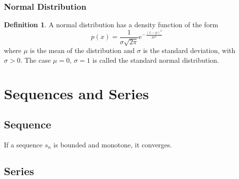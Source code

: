 \documentclass[12pt]{article}
\theoremstyle{definition}
\theoremstyle{definition}
\newtheorem{definition}{Definition}[section]
\theoremstyle{remark}
\theoremstyle{definition}
\theoremstyle{definition}
\theoremstyle{definition}
\begin{document}
\subsubsection*{Normal Distribution}
\begin{definition}
A normal distribution has a density function of the form 
\[p(x)=\frac{1}{\sigma \sqrt{2 \pi}}e^{-\frac{(x-\mu)^2}{2\sigma^2}}\] where $\mu$ is the mean of the distribution and $\sigma$ is the standard deviation, with $\sigma > 0$.
The case $\mu = 0$, $\sigma = 1$ is called the standard normal distribution.

\end{definition}

\section{Sequences and Series}
\subsection{Sequence}

If a sequence $s_n$ is bounded and monotone, it converges.


\subsection{Series}
\end{document}
